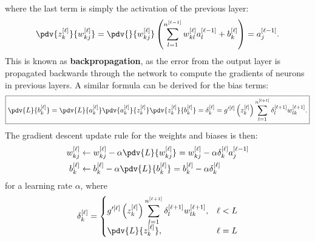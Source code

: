 \documentclass{article}
\begin{document}
where the last term is simply the activation of the previous layer:
\begin{equation*}
    \pdv{z_k^{\left[ \ell \right]}}{w_{kj}^{\left[ \ell \right]}} = \pdv{}{w_{kj}^{\left[ \ell \right]}} \left( \sum_{l = 1}^{n^{\left[ \ell - 1 \right]}} w_{kl}^{\left[ \ell \right]} a_l^{\left[ \ell - 1 \right]} + b_k^{\left[ \ell \right]} \right) = a_j^{\left[ \ell - 1 \right]}.
\end{equation*}
This is known as \textbf{backpropagation}, as the error from the output
layer is propagated backwards through the network to compute the
gradients of neurons in previous layers.
A similar formula can be derived for the bias terms:
\begin{equation*}
    \boxed{
    \pdv{L}{b_k^{\left[ \ell \right]}} = \pdv{L}{a_k^{\left[ \ell \right]}} \pdv{a_k^{\left[ \ell \right]}}{z_k^{\left[ \ell \right]}} \pdv{z_k^{\left[ \ell \right]}}{b_k^{\left[ \ell \right]}} = \delta_k^{\left[ \ell \right]} = g^{\prime\left[ \ell \right]}\left( z_k^{\left[ \ell \right]} \right) \sum_{l = 1}^{n^{\left[ \ell + 1 \right]}} \delta_{l}^{\left[ \ell + 1 \right]} w_{l k}^{\left[ \ell + 1 \right]}.
    }
\end{equation*}
The gradient descent update rule for the weights and biases is then:
\begin{align*}
    w_{kj}^{\left[ \ell \right]} & \leftarrow w_{kj}^{\left[ \ell \right]} - \alpha \pdv{L}{w_{kj}^{\left[ \ell \right]}} = w_{kj}^{\left[ \ell \right]} - \alpha \delta_k^{\left[ \ell \right]} a_j^{\left[ \ell - 1 \right]} \\
    b_k^{\left[ \ell \right]}    & \leftarrow b_k^{\left[ \ell \right]} - \alpha \pdv{L}{b_k^{\left[ \ell \right]}} = b_k^{\left[ \ell \right]} - \alpha \delta_k^{\left[ \ell \right]}
\end{align*}
for a learning rate \(\alpha\), where
\begin{equation*}
    \delta_k^{\left[ \ell \right]} =
    \begin{cases}
        \displaystyle g^{\prime\left[ \ell \right]}\left( z_k^{\left[ \ell \right]} \right) \sum_{l = 1}^{n^{\left[ \ell + 1 \right]}} \delta_{l}^{\left[ \ell + 1 \right]} w_{l k}^{\left[ \ell + 1 \right]}, & \ell < L \\
        \displaystyle \pdv{L}{z_k^{\left[ \ell \right]}},                                                                                                                                                      & \ell = L
    \end{cases}
\end{equation*}
\end{document}
